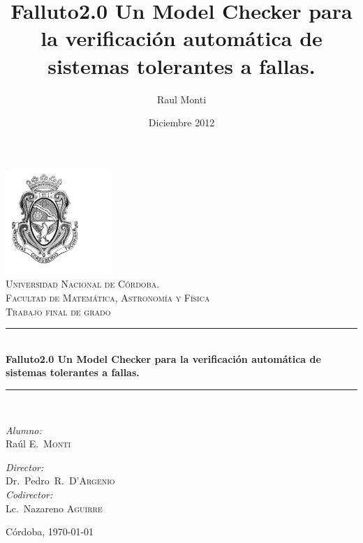 \documentclass[titlepage, 12pt]{book}
\title{Falluto2.0 Un Model Checker para la verificaci\'on autom\'atica de sistemas tolerantes a fallas.}
\author{Raul Monti}
\date{Diciembre 2012}
\newcommand{\HRule}{\rule{\linewidth}{0.5mm}}
\begin{document}

%

\begin{titlepage}
\begin{center}

\includegraphics[width=0.30\textwidth]{./Imagenes/logo}~\\[1cm]

\textsc{\LARGE Universidad Nacional de C\'ordoba.\\ Facultad de Matem\'atica, Astronom\'ia y F\'isica}\\[1.0cm]

\textsc{\Large Trabajo final de grado}\\[0.5cm]

\HRule \\[0.4cm]
{ \huge \bfseries Falluto2.0 Un Model Checker para la verificaci\'on autom\'atica de sistemas tolerantes a fallas.}\\[0.4cm]

\HRule \\[1.0cm]

\begin{minipage}{0.4\textwidth}
\begin{flushleft} \large
\emph{Alumno:}\\
Ra\'ul E.~\textsc{Monti}
\end{flushleft}
\end{minipage}
\begin{minipage}{0.4\textwidth}
\begin{flushright} \large
\emph{Director:} \\
Dr.~Pedro~R.~\textsc{D'Argenio}\\
\emph{Codirector:} \\
Lc.~Nazareno \textsc{Aguirre}
\end{flushright}
\end{minipage}

\vfill

\begin{flushright}
{\large C\'ordoba, \today}
\end{flushright}

\end{center}
\end{titlepage}
\end{document}
